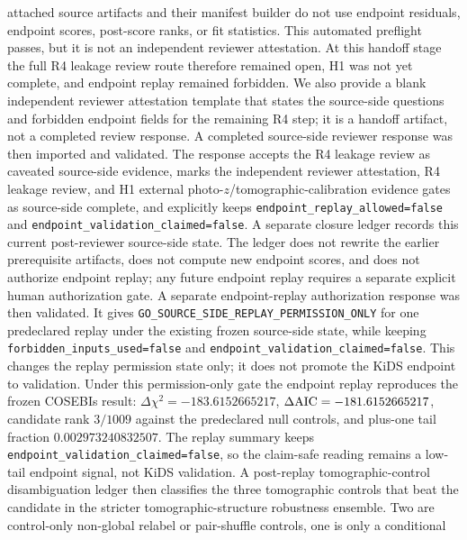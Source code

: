 \documentclass[11pt]{article}
\begin{document}
attached source artifacts and their manifest builder do not use endpoint
residuals, endpoint scores, post-score ranks, or fit statistics. This automated
preflight passes, but it is not an independent reviewer attestation. At this
handoff stage the full R4 leakage review route therefore remained open, H1 was
not yet complete, and endpoint replay remained forbidden. We also provide a
blank independent reviewer attestation template that states the source-side
questions and forbidden endpoint fields for the remaining R4 step; it is a
handoff artifact, not a completed review response.
A completed source-side reviewer response was then imported and validated. The
response accepts the R4 leakage review as caveated source-side evidence, marks
the independent reviewer attestation, R4 leakage review, and H1 external
photo-\(z\)/tomographic-calibration evidence gates as source-side complete, and
explicitly keeps \texttt{endpoint\_\allowbreak{}replay\_\allowbreak{}allowed=false} and
\texttt{endpoint\_\allowbreak{}validation\_\allowbreak{}claimed=false}. A separate closure ledger records
this current post-reviewer source-side state. The ledger does not rewrite the
earlier prerequisite artifacts, does not compute new endpoint scores, and does
not authorize endpoint replay; any future endpoint replay requires a separate
explicit human authorization gate.
A separate endpoint-replay authorization response was then validated. It gives
\texttt{GO\_\allowbreak{}SOURCE\_\allowbreak{}SIDE\_\allowbreak{}REPLAY\_\allowbreak{}PERMISSION\_\allowbreak{}ONLY} for one predeclared replay
under the existing frozen source-side state, while keeping
\texttt{forbidden\_\allowbreak{}inputs\_\allowbreak{}used=false} and
\texttt{endpoint\_\allowbreak{}validation\_\allowbreak{}claimed=false}. This changes the replay permission
state only; it does not promote the KiDS endpoint to validation.
Under this permission-only gate the endpoint replay reproduces the frozen
COSEBIs result: \(\Delta\chi^2=-183.6152665217\), \(\Delta{\rm AIC}=-181.6152665217\),
candidate rank \(3/1009\) against the predeclared null controls, and plus-one
tail fraction \(0.002973240832507\). The replay summary keeps
\texttt{endpoint\_\allowbreak{}validation\_\allowbreak{}claimed=false}, so the claim-safe reading remains a
low-tail endpoint signal, not KiDS validation.
A post-replay tomographic-control disambiguation ledger then classifies the
three tomographic controls that beat the candidate in the stricter
tomographic-structure robustness ensemble. Two are control-only
non-global relabel or pair-shuffle controls, one is only a conditional
\end{document}
